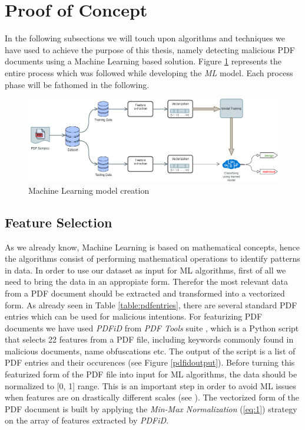 \section{Proof of Concept}
\label{section:poc}

In the following subsections we will touch upon algorithms and techniques we have used to achieve the purpose of this thesis, namely detecting malicious PDF documents using a Machine Learning based solution. Figure \ref{mlsteps} represents the entire process which was followed while developing the \textit{ML} model. Each process phase will be fathomed in the following.

\begin{figure}[H]
	\centerline{\includegraphics[scale=0.5]{figures/ml.png}}  
	\caption{Machine Learning model creation}
	\label{mlsteps}
\end{figure}

\subsection{Feature Selection}
As we already know, Machine Learning is based on mathematical concepts, hence the algorithms consist of performing mathematical operations to identify patterns in data. In order to use our dataset as input for ML algorithms, first of all we need to bring the data in an appropiate form. Therefor the most relevant data from a PDF document should be extracted and transformed into a vectorized form. As already seen in Table \ref{table:pdfentries}, there are several standard PDF entries which can be used for malicious intentions. For featurizing PDF documents we have used \textit{PDFiD} from \textit{PDF Tools} suite \cite{pdftools}, which is a Python script that selects 22 features from a PDF file, including keywords commonly found in malicious documents, name obfuscations etc. The output of the script is a list of PDF entries and their occurences (see Figure \ref{pdfidoutput}). Before turning this featurized form of the PDF file into input for ML algorithms, the data should be normalized to [0, 1] range. This is an important step in order to avoid ML issues when features are on drastically different scales (see \cite{mlCookbook}). The vectorized form of the PDF document is built by applying the \textit{Min-Max Normalization} (\ref{eq:1}) strategy on the array of features extracted by \textit{PDFiD}.

